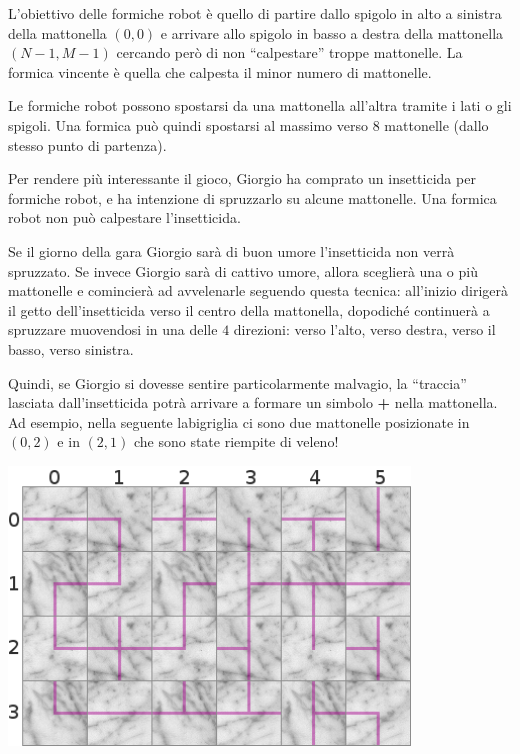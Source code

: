 L'obiettivo delle formiche robot è quello di partire dallo spigolo in alto a sinistra della mattonella $(0, 0)$ e arrivare allo spigolo in basso a destra della mattonella $(N-1, M-1)$ cercando però di non ``calpestare'' troppe mattonelle. La formica vincente è quella che calpesta il minor numero di mattonelle.

\begin{warning}
  Le formiche robot possono spostarsi da una mattonella all'altra tramite i lati o gli spigoli. Una formica può quindi spostarsi al massimo verso $8$ mattonelle (dallo stesso punto di partenza).
\end{warning}

Per rendere più interessante il gioco, Giorgio ha comprato un insetticida per formiche robot, e ha intenzione di spruzzarlo su alcune mattonelle. Una formica robot non può calpestare l'insetticida.

Se il giorno della gara Giorgio sarà di buon umore l'insetticida non verrà spruzzato. Se invece Giorgio sarà di cattivo umore, allora sceglierà una o più mattonelle e comincierà ad avvelenarle seguendo questa tecnica: all'inizio dirigerà il getto dell'insetticida verso il centro della mattonella, dopodiché continuerà a spruzzare muovendosi in una delle $4$ direzioni: verso l'alto, verso destra, verso il basso, verso sinistra.

Quindi, se Giorgio si dovesse sentire particolarmente malvagio, la ``traccia'' lasciata dall'insetticida potrà arrivare a formare un simbolo { \Large \color{magenta} \textbf{+} } nella mattonella. Ad esempio, nella seguente labigriglia ci sono due mattonelle posizionate in $(0, 2)$ e in $(2, 1)$ che sono state riempite di veleno!

\begin{center}
  \includegraphics[width=0.8\textwidth]{floor-poison.png}
\end{center}

